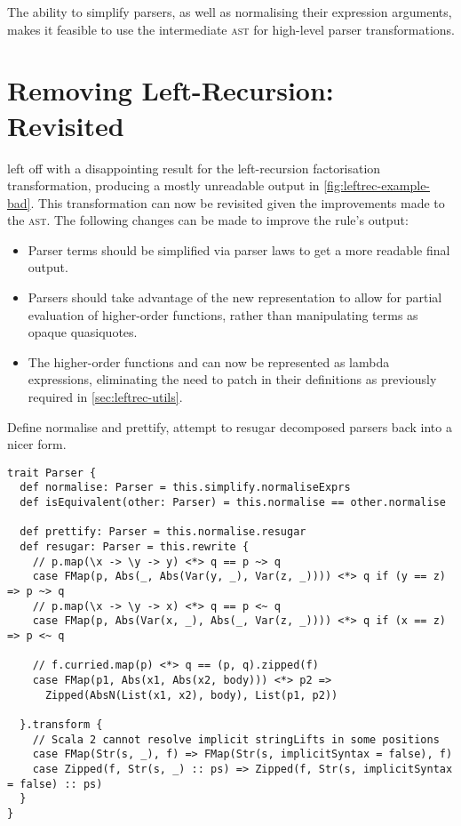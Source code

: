 \documentclass[../../main.tex]{subfiles}
\begin{document}
The ability to simplify parsers, as well as normalising their expression arguments, makes it feasible to use the intermediate  \textsc{ast} for high-level parser transformations.

\section{Removing Left-Recursion: Revisited}
 left off with a disappointing result for the left-recursion factorisation transformation, producing a mostly unreadable output in \cref{fig:leftrec-example-bad}.
This transformation can now be revisited given the improvements made to the  \textsc{ast}.
The following changes can be made to improve the rule's output:
\begin{itemize}
  \item Parser terms should be simplified via parser laws to get a more readable final output.
  \item Parsers should take advantage of the new  representation to allow for partial evaluation of higher-order functions, rather than manipulating terms as opaque quasiquotes.
  \item The higher-order functions  and  can now be represented as  lambda expressions, eliminating the need to patch in their definitions as previously required in \cref{sec:leftrec-utils}.
\end{itemize}

Define normalise and prettify, attempt to resugar decomposed parsers back into a nicer form.

\begin{verbatim}
trait Parser {
  def normalise: Parser = this.simplify.normaliseExprs
  def isEquivalent(other: Parser) = this.normalise == other.normalise

  def prettify: Parser = this.normalise.resugar
  def resugar: Parser = this.rewrite {
    // p.map(\x -> \y -> y) <*> q == p ~> q
    case FMap(p, Abs(_, Abs(Var(y, _), Var(z, _)))) <*> q if (y == z) => p ~> q
    // p.map(\x -> \y -> x) <*> q == p <~ q
    case FMap(p, Abs(Var(x, _), Abs(_, Var(z, _)))) <*> q if (x == z) => p <~ q

    // f.curried.map(p) <*> q == (p, q).zipped(f)
    case FMap(p1, Abs(x1, Abs(x2, body))) <*> p2 =>
      Zipped(AbsN(List(x1, x2), body), List(p1, p2))

  }.transform {
    // Scala 2 cannot resolve implicit stringLifts in some positions
    case FMap(Str(s, _), f) => FMap(Str(s, implicitSyntax = false), f)
    case Zipped(f, Str(s, _) :: ps) => Zipped(f, Str(s, implicitSyntax = false) :: ps)
  }
}
\end{verbatim}
\end{document}
